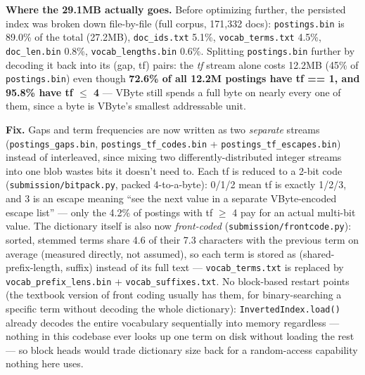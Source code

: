 \documentclass[11pt]{article}
\begin{document}
\textbf{Where the 29.1MB actually goes.} Before optimizing further, the
persisted index was broken down file-by-file (full corpus,
171{,}332 docs): \texttt{postings.bin} is 89.0\% of the total
(27.2MB), \texttt{doc\_ids.txt} 5.1\%, \texttt{vocab\_terms.txt} 4.5\%,
\texttt{doc\_len.bin} 0.8\%, \texttt{vocab\_lengths.bin} 0.6\%. Splitting
\texttt{postings.bin} further by decoding it back into its (gap, tf)
pairs: the \emph{tf} stream alone costs 12.2MB (45\% of
\texttt{postings.bin}) even though \textbf{72.6\% of all 12.2M postings
have tf == 1, and 95.8\% have tf $\le$ 4} --- VByte still spends a full
byte on nearly every one of them, since a byte is VByte's smallest
addressable unit.

\textbf{Fix.} Gaps and term frequencies are now written as two
\emph{separate} streams (\texttt{postings\_gaps.bin},
\texttt{postings\_tf\_codes.bin} + \texttt{postings\_tf\_escapes.bin})
instead of interleaved, since mixing two differently-distributed integer
streams into one blob wastes bits it doesn't need to. Each tf is reduced
to a 2-bit code (\texttt{submission/bitpack.py}, packed 4-to-a-byte):
0/1/2 mean tf is exactly 1/2/3, and 3 is an escape meaning ``see the next
value in a separate VByte-encoded escape list'' --- only the 4.2\% of
postings with tf $\ge$ 4 pay for an actual multi-bit value. The
dictionary itself is also now \emph{front-coded}
(\texttt{submission/frontcode.py}): sorted, stemmed terms share 4.6 of
their 7.3 characters with the previous term on average (measured
directly, not assumed), so each term is stored as (shared-prefix-length,
suffix) instead of its full text --- \texttt{vocab\_terms.txt} is
replaced by \texttt{vocab\_prefix\_lens.bin} + \texttt{vocab\_suffixes.txt}.
No block-based restart points (the textbook version of front coding
usually has them, for binary-searching a specific term without decoding
the whole dictionary): \texttt{InvertedIndex.load()} already decodes the
entire vocabulary sequentially into memory regardless --- nothing in this
codebase ever looks up one term on disk without loading the rest --- so
block heads would trade dictionary size back for a random-access
capability nothing here uses.
\end{document}
